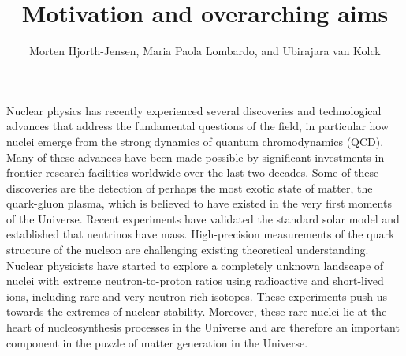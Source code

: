 \title{Motivation and overarching aims}
\author{Morten Hjorth-Jensen, Maria Paola Lombardo, and Ubirajara van Kolck}

\maketitle


Nuclear physics has recently experienced several discoveries and
technological advances that address the fundamental questions of the
field, in particular how nuclei emerge from the strong dynamics
of quantum chromodynamics (QCD).
Many of these advances have been made possible by significant
investments in frontier research facilities worldwide over the last
two decades. Some of these discoveries are the detection of perhaps
the most exotic state of matter, the quark-gluon plasma, which is
believed to have existed in the very first moments of the Universe.  
Recent experiments have validated the standard solar model
and established that neutrinos have mass. High-precision
measurements of the quark structure of the nucleon are challenging
existing theoretical understanding.  Nuclear physicists have started
to explore a completely unknown landscape of nuclei with extreme
neutron-to-proton ratios using radioactive and short-lived ions,
including rare and very neutron-rich isotopes.  These experiments push
us towards the extremes of nuclear stability.  Moreover, these rare
nuclei lie at the heart of nucleosynthesis processes in the Universe
and are therefore an important component in the puzzle of matter
generation in the Universe.

